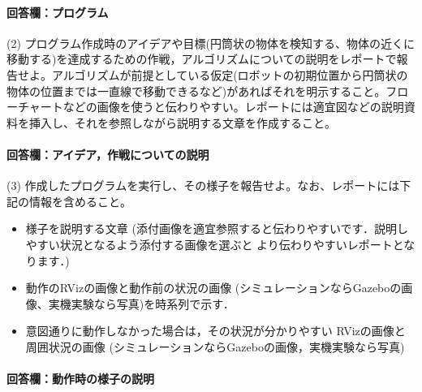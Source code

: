 \documentclass[12pt, xelatex,ja=standard,jafont=noto]{bxjsarticle}
\newif\ifdraft
\begin{document}
\paragraph{回答欄：プログラム}
\ifdraft
センサ情報から円筒状の物体を検知しその近くに移動するプログラムをリスト\ref{lst:movetocylinder}に示す…
\begin{lstlisting}[caption=コード,label=lst:movetocylinder]
...
\end{lstlisting}
\fi

\begin{itembox}[l]{(2)}
プログラム作成時のアイデアや目標(円筒状の物体を検知する、物体の近くに移動する)を達成するための作戦，アルゴリズムについての説明をレポートで報告せよ。アルゴリズムが前提としている仮定(ロボットの初期位置から円筒状の物体の位置までは一直線で移動できるなど)があればそれを明示すること。フローチャートなどの画像を使うと伝わりやすい。レポートには適宜図などの説明資料を挿入し、それを参照しながら説明する文章を作成すること。
\end{itembox}

\paragraph{回答欄：アイデア，作戦についての説明}
\ifdraft
アイデアや作戦について図や画像を交えながら詳しく説明する．
\fi

\begin{itembox}[l]{(3)}
作成したプログラムを実行し、その様子を報告せよ。なお、レポートには下記の情報を含めること。
\begin{itemize}
    \item 様子を説明する文章 (添付画像を適宜参照すると伝わりやすいです．説明しやすい状況となるよう添付する画像を選ぶと より伝わりやすいレポートとなります．)
    \item 動作のRVizの画像と動作前の状況の画像 (シミュレーションならGazeboの画像、実機実験なら写真)を時系列で示す．
    \item 意図通りに動作しなかった場合は，その状況が分かりやすい RVizの画像と周囲状況の画像 (シミュレーションならGazeboの画像，実機実験なら写真)
\end{itemize}
\end{itembox}

\paragraph{回答欄：動作時の様子の説明}
\ifdraft
動作時の様子を説明する文章を記載する．
\fi
\end{document}

